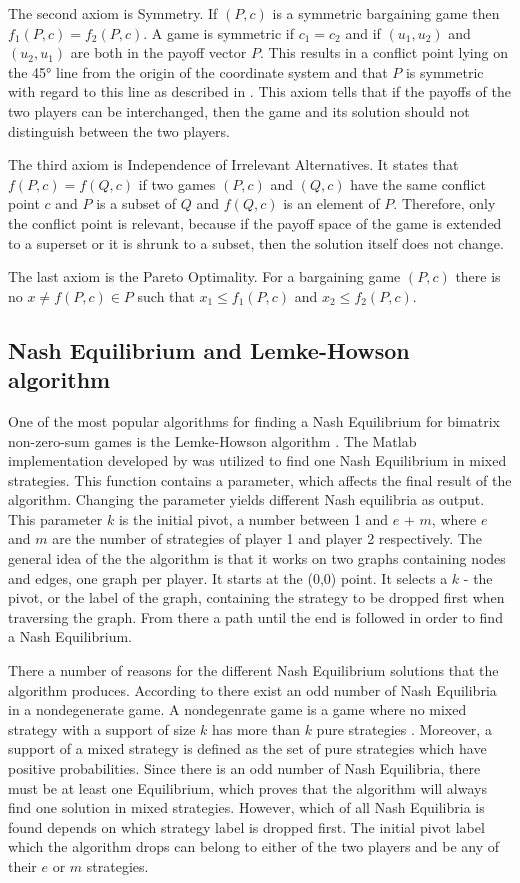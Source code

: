 The second axiom is Symmetry. If $(P,c)$ is a symmetric bargaining game then $f_1(P,c) = f_2(P,c)$. A game is symmetric if $c_1 = c_2$ and if $(u_1, u_2)$ and $(u_2, u_1)$ are both in the payoff vector $P$. This results in a conflict point lying on the 45° line from the origin of the coordinate system and that $P$ is symmetric with regard to this line as described in \citet{holler2006einfuhrung}. This axiom tells that if the payoffs of the two players can be interchanged, then the game and its solution should not distinguish between the two players.

The third axiom is Independence of Irrelevant Alternatives. It states that $f(P,c) = f(Q,c)$ if two games $(P,c)$ and $(Q,c)$ have the same conflict point $c$ and $P$ is a subset of $Q$ and $f(Q,c)$ is an element of $P$. Therefore, only the conflict point is relevant, because if the payoff space of the game is extended to a superset or it is shrunk to a subset, then the solution itself does not change.

The last axiom is the Pareto Optimality. For a bargaining game $(P,c)$ there is no $x \neq f(P,c) \in P$ such that $x_1 \leq f_1(P,c)$ and $x_2 \leq f_2(P,c)$.

\subsection{Nash Equilibrium and Lemke-Howson algorithm}
One of the most popular algorithms for finding a Nash Equilibrium for bimatrix non-zero-sum games is the Lemke-Howson algorithm \citep{lemke1964equilibrium}. The Matlab implementation developed by \citet{lemkeHowson2014Matlab} was utilized to find one Nash Equilibrium in mixed strategies. This function contains a parameter, which affects the final result of the algorithm. Changing the parameter yields different Nash equilibria as output. This parameter $k$ is the initial pivot, a number between 1 and $e$ + $m$, where $e$ and $m$ are the number of strategies of player 1 and player 2 respectively. The general idea of the the algorithm is that it works on two graphs containing nodes and edges, one graph per player. It starts at the (0,0) point. It selects a $k$ - the pivot, or the label of the graph, containing the strategy to be dropped first when traversing the graph. From there a path until the end is followed in order to find a Nash Equilibrium. 

There a number of reasons for the different Nash Equilibrium solutions that the algorithm produces. According to \cite{lemke1964equilibrium} there exist an odd number of Nash Equilibria in a nondegenerate game. A nondegenrate game is a game where no mixed strategy with a support of size $k$ has more than $k$ pure strategies \citet{nisan2007algorithmic}. Moreover, a support of a mixed strategy is defined as the set of pure strategies which have positive probabilities. Since there is an odd number of Nash Equilibria, there must be at least one Equilibrium, which proves that the algorithm will always find one solution in mixed strategies. However, which of all Nash Equilibria is found depends on which strategy label is dropped first. The initial pivot label which the algorithm drops can belong to either of the two players and be any of their $e$ or $m$ strategies.

